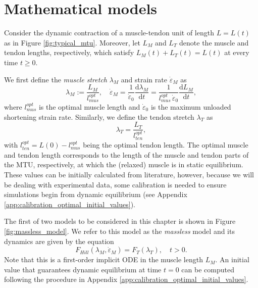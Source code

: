 \documentclass{sfuthesis}
\numberwithin{equation}{chapter}
\numberwithin{figure}{chapter}
\numberwithin{table}{chapter}
\theoremstyle{definition}
\newcommand{\dder}[2]{\dfrac{\mathrm{d} #1}{\mathrm{d} #2}}
\newcommand{\depsilon}{\dot{\varepsilon}}
\begin{document}
\section{Mathematical models}

Consider the dynamic contraction of a muscle-tendon unit of length $L = L(t)$ as in Figure \ref{fig:typical_mtu}. Moreover, let $L_M$ and $L_T$ denote the muscle and tendon lengths, respectively, which satisfy $L_M(t) + L_T(t) = L(t)$ at every time $t \geq 0$.

We first define the \textit{muscle stretch} $\lambda_M$ and {strain rate} $\depsilon_M$ as
\begin{equation}
    \lambda_M := \dfrac{L_M}{l_{mus}^{opt}}, \quad \depsilon_M = \dfrac{1}{\depsilon_0} \dder{\lambda_M}{t} = \dfrac{1}{l_{mus}^{opt} \, \depsilon_0} \dder{L_M}{t},
\end{equation}
where $l_{mus}^{opt}$ is the optimal muscle length and $\depsilon_0$ is the maximum unloaded shortening strain rate. Similarly, we define the tendon stretch $\lambda_T$ as
\begin{equation}
    \lambda_T = \dfrac{L_T}{l^{opt}_{ten}}, 
\end{equation} 
with $l_{ten}^{opt} = L(0) - l_{mus}^{opt}$ being the optimal tendon length. The optimal muscle and tendon length corresponds to the length of the muscle and tendon parts of the MTU, respectively, at which the (relaxed) muscle is in static equilibrium.  These values can be initially calculated from literature, however, because we will be dealing with experimental data, some calibration is needed to ensure simulations begin from dynamic equilibrium (see Appendix \ref{app:calibration_optimal_initial_values}).

The first of two models to be considered in this chapter is shown in Figure \ref{fig:massless_model}. We refer to this model as the \textit{massless} model and its dynamics are given by the equation
\begin{equation} \label{eq:massless_model}
    F_{Hill}(\lambda_M, \depsilon_M) = F_T(\lambda_T), \quad t > 0.
\end{equation}
Note that this is a first-order implicit ODE in the muscle length $L_M$. An initial value that guarantees dynamic equilibrium at time $t=0$ can be computed following the procedure in Appendix \ref{app:calibration_optimal_initial_values}.
\end{document}
